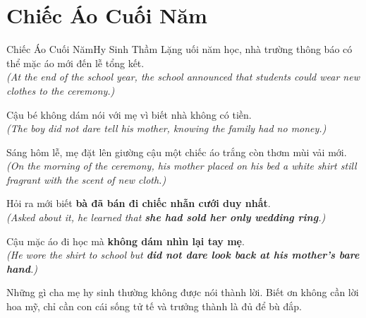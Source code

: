 \section{Chiếc Áo Cuối Năm}
\begin{truyen}{Chiếc Áo Cuối Năm}{Hy Sinh Thầm Lặng}
uối năm học, nhà trường thông báo có thể mặc áo mới đến lễ tổng kết.\\
\textit{(At the end of the school year, the school announced that students could wear new clothes to the ceremony.)}

Cậu bé không dám nói với mẹ vì biết nhà không có tiền.\\
\textit{(The boy did not dare tell his mother, knowing the family had no money.)}

Sáng hôm lễ, mẹ đặt lên giường cậu một chiếc áo trắng còn thơm mùi vải mới.\\
\textit{(On the morning of the ceremony, his mother placed on his bed a white shirt still fragrant with the scent of new cloth.)}

Hỏi ra mới biết \textbf{bà đã bán đi chiếc nhẫn cưới duy nhất}.\\
\textit{(Asked about it, he learned that \textbf{she had sold her only wedding ring}.)}

Cậu mặc áo đi học mà \textbf{không dám nhìn lại tay mẹ}.\\
\textit{(He wore the shirt to school but \textbf{did not dare look back at his mother's bare hand}.)}
\end{truyen}
\begin{baihoc}
  Những gì cha mẹ hy sinh thường không được nói thành lời. Biết ơn không cần lời hoa mỹ, chỉ cần con cái sống tử tế và trưởng thành là đủ để bù đắp.
\end{baihoc}

